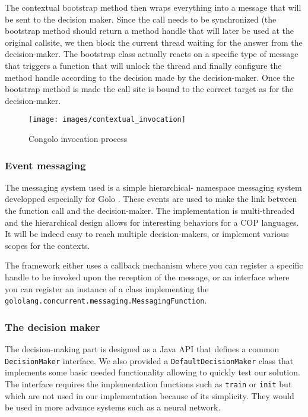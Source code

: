 \documentclass{sig-alternate}
\begin{document}
The contextual bootstrap method then wraps everything into a message that will be sent to the decision maker. Since the call needs to be synchronized (the bootstrap method should return a method handle that will later be used at the original callsite, we then block the current thread waiting for the answer from the decision-maker. The bootstrap class actually reacts on a specific type of message that triggers a function that will unlock the thread and finally configure the method handle according to the decision made by the decision-maker. Once the bootstrap method is made the call site is bound to the correct target as for the decision-maker.

\begin{center}
\begin{figure}
\centering
\texttt{[image: images/contextual\_invocation]}
\caption{Congolo invocation process}
\label{figure:congoloinvoke}
\end{figure}
\end{center}

\subsubsection{Event messaging}
The messaging system used is a simple hierarchical- namespace messaging system developped especially for Golo \cite{flemouel_gololang-messaging_2013}. These events are used to make the link between the function call and the decision-maker. The implementation is multi-threaded and the hierarchical design allows for interesting behaviors for a COP languages. It will be indeed easy to reach multiple decision-makers, or implement various scopes for the contexts.

The framework either uses a callback mechanism where you can register a specific handle to be invoked upon the reception of the message, or an interface where you can register an instance of a class implementing the \lstinline|gololang.concurrent.messaging.MessagingFunction|.

\subsubsection{The decision maker}
The decision-making part is designed as a Java API that defines a common \lstinline|DecisionMaker| interface. We also provided a \lstinline|DefaultDecisionMaker| class that implements some basic needed functionality allowing to quickly test our solution. The interface requires the implementation functions such as \lstinline|train| or \lstinline|init| but which are not used in our implementation because of its simplicity. They would be used in more advance systems such as a neural network. 
\end{document}
